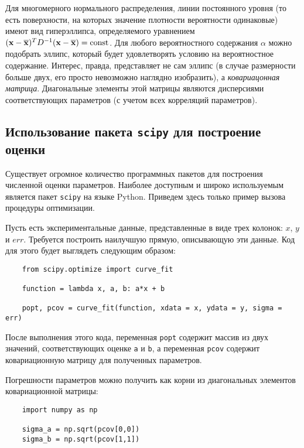Для многомерного нормального распределения, линии постоянного уровня (то
есть поверхности, на которых значение плотности вероятности одинаковые)
имеют вид гиперэллипса, определяемого уравнением
$(\mathbf{x} - \overline{\mathbf{x}})^T D^{-1} (\mathbf{x} - \overline{\mathbf{x}}) = \mathrm{const}$.
Для любого вероятностного содержания $\alpha$ можно подобрать эллипс, который будет
удовлетворять условию на вероятностное содержание. Интерес, правда,
представляет не сам эллипс (в случае размерности больше двух, его просто
невозможно наглядно изобразить), а \emph{ковариацонная матрица}. Диагональные элементы
этой матрицы являются дисперсиями соответствующих параметров (с учетом
всех корреляций параметров).

\subsection{Использование пакета \texttt{scipy} для построение оценки}

Существует огромное количество программных пакетов для построения численной оценки параметров. Наиболее доступным и широко используемым является пакет \texttt{scipy} на языке Python. Приведем здесь только пример вызова процедуры оптимизации.

Пусть есть экспериментальные данные, представленные в виде трех колонок: $x$, $y$ и $err$. Требуется построить наилучшую прямую, описывающую эти данные.
Код для этого будет выглядеть следующим образом:
\begin{verbatim}
    from scipy.optimize import curve_fit

    function = lambda x, a, b: a*x + b

    popt, pcov = curve_fit(function, xdata = x, ydata = y, sigma = err)
\end{verbatim}

После выполнения этого кода, переменная \texttt{popt} содержит массив из двух значений, соответствующих оценке \texttt{a} и \texttt{b}, а переменная \texttt{pcov} содержит ковариационную матрицу для полученных параметров. 

Погрешности параметров можно получить как корни из диагональных элементов ковариационной матрицы:
\begin{verbatim}
    import numpy as np
    
    sigma_a = np.sqrt(pcov[0,0])
    sigma_b = np.sqrt(pcov[1,1])
\end{verbatim}


